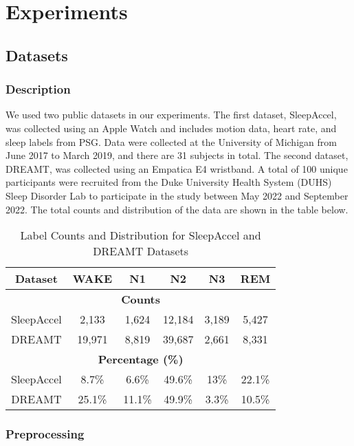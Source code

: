 \chapter{Experiments}

\section{Datasets}

\subsection{Description}
\hspace{2em}We used two public datasets in our experiments. The first dataset, SleepAccel, was collected using an Apple Watch and includes motion data, heart rate, and sleep labels from PSG. Data were collected at the University of Michigan from June 2017 to March 2019, and there are 31 subjects in total. The second dataset, DREAMT, was collected using an Empatica E4 wristband. A total of 100 unique participants were recruited from the Duke University Health System (DUHS) Sleep Disorder Lab to participate in the study between May 2022 and September 2022. The total counts and distribution of the data are shown in the table below.

\begin{table}[h]
\centering
\caption{Label Counts and Distribution for SleepAccel and DREAMT Datasets}
\begin{tabular}{|c|c|c|c|c|c|}
\hline
\textbf{Dataset} & \textbf{WAKE} & \textbf{N1} & \textbf{N2} & \textbf{N3} & \textbf{REM} \\ \hline
\multicolumn{6}{|c|}{\textbf{Counts}} \\ \hline
SleepAccel       & 2,133         & 1,624       & 12,184       & 3,189       & 5,427           \\ \hline
DREAMT           & 19,971        & 8,819       & 39,687      & 2,661       & 8,331           \\ \hline
\multicolumn{6}{|c|}{\textbf{Percentage (\%)}} \\ \hline
SleepAccel       & 8.7\%       & 6.6\%     & 49.6\%     & 13\%     & 22.1\%          \\ \hline
DREAMT           & 25.1\%       & 11.1\%     & 49.9\%     & 3.3\%     & 10.5\%          \\ \hline
\end{tabular}
\end{table}

\subsection{Preprocessing}

